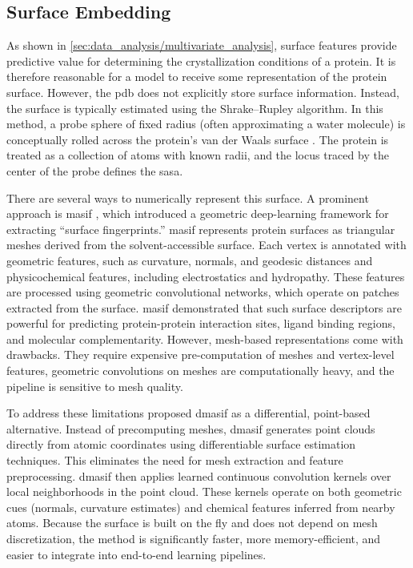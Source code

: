 \subsection{Surface Embedding}\label{sec:methods/feature_engineering/surface_embedding}

As shown in \autoref{sec:data_analysis/multivariate_analysis}, surface features provide predictive value for determining the crystallization conditions of a protein. It is therefore reasonable for a model to receive some representation of the protein surface. However, the \gls{pdb} does not explicitly store surface information. Instead, the surface is typically estimated using the Shrake–Rupley algorithm. In this method, a probe sphere of fixed radius (often approximating a water molecule) is conceptually rolled across the protein’s van der Waals surface \parencite{Shrake1973}. The protein is treated as a collection of atoms with known radii, and the locus traced by the center of the probe defines the \gls{sasa}.

There are several ways to numerically represent this surface. A prominent approach is \gls{masif} \parencite{Gainza2020}, which introduced a geometric deep-learning framework for extracting “surface fingerprints.”
\gls{masif} represents protein surfaces as triangular meshes derived from the solvent-accessible surface. Each vertex is annotated with geometric features, such as curvature, normals, and geodesic distances and physicochemical features, including electrostatics and hydropathy. These features are processed using geometric convolutional networks, which operate on patches extracted from the surface.
\gls{masif} demonstrated that such surface descriptors are powerful for predicting protein-protein interaction sites, ligand binding regions, and molecular complementarity. However, mesh-based representations come with drawbacks. They require expensive pre-computation of meshes and vertex-level features, geometric convolutions on meshes are computationally heavy, and the pipeline is sensitive to mesh quality.

To address these limitations \textcite{Sverrisson2020} proposed \gls{dmasif} as a differential, point-based alternative. Instead of precomputing meshes, \gls{dmasif} generates point clouds directly from atomic coordinates using differentiable surface estimation techniques. This eliminates the need for mesh extraction and feature preprocessing.
\gls{dmasif} then applies learned continuous convolution kernels over local neighborhoods in the point cloud. These kernels operate on both geometric cues (normals, curvature estimates) and chemical features inferred from nearby atoms. Because the surface is built on the fly and does not depend on mesh discretization, the method is significantly faster, more memory-efficient, and easier to integrate into end-to-end learning pipelines.

